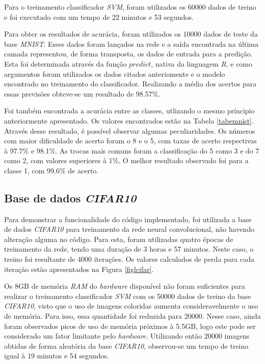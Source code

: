 \documentclass[conference]{IEEEtran}
\begin{document}
Para o treinamento classificador \textit{SVM}, foram utilizados os 60000 dados de treino e foi executado com um tempo de 22 minutos e 53 segundos.

Para obter os resultados de acurácia, foram utilizados os 10000 dados de teste da base \textit{MNIST}. Esses dados foram lançados na rede e a saída encontrada na última camada representou, de forma transposta, os dados de entrada para a predição. Esta foi determinada através da função $predict$, nativa da linguagem \textit{R}, e como argumentos foram utilizados os dados citados anteriomente e o modelo encontrado no treinamento do classificador. Realizando a média dos acertos para essas previsões obteve-se um resultado de 98.57\%.

Foi também encontrada a acurácia entre as classes, utlizando o mesmo príncipio anteriormente apresentado. Os valores encontrados estão na Tabela \ref{tabemnist}. Através desse resultado, é possível observar algumas peculiaridades. Os números com maior dificuldade de acerto foram o 8 e o 5, com taxas de acerto respectivas à 97.7\% e 98.1\%. As trocas mais comuns foram a classificação do 5 como 3 e do 7 como 2, com valores superiores à 1\%. O melhor resultado observado foi para a classe 1, com 99.6\% de acerto.



\subsection{Base de dados \textit{CIFAR10}} \label{result:cifar}

Para demonstrar a funcionalidade do código implementado, foi utilizada a base de dados \textit{CIFAR10} para treinamento da rede neural convolucional, não havendo alteração alguma no código. Para esta, foram utilizadas quatro épocas de treinamento da rede, tendo uma duração de 3 horas e 57 minutos. Neste caso, o treino foi resultante de 4000 iterações. Os valores calculados de perda para cada iteração estão apresentados na Figura \ref{figlcifar}.

Os 8GB de memória \textit{RAM} do \textit{hardware} disponível não foram suficientes para realizar o treinamento classificador \textit{SVM} com os 50000 dados de treino da base \textit{CIFAR10}, visto que o uso de imagens coloridas aumenta consideravelmente o uso de memória. Para isso, essa quantidade foi reduzida para 20000. Nesse caso, ainda foram observados picos de uso de memória próximos à 5.5GB, logo este pode ser considerado um fator limitante pelo \textit{hardware}. Utilizando então 20000 imagens obtidas de forma aleatória da base \textit{CIFAR10}, observou-se um tempo de treino igual à 19 minutos e 54 segundos.
\end{document}
